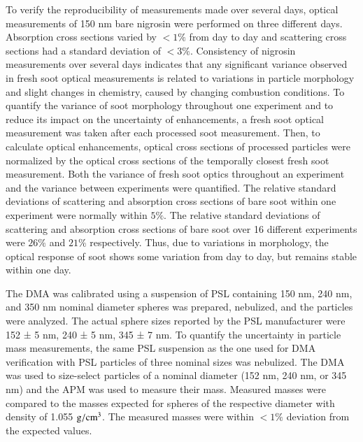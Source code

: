 To verify the reproducibility of measurements made over several days, optical measurements of 150 nm bare nigrosin were performed on three different days. Absorption cross sections varied by $<1\%$ from day to day and scattering cross sections had a standard deviation of $<3\%$. Consistency of nigrosin measurements over several days indicates that any significant variance observed in fresh soot optical measurements is related to variations in particle morphology and slight changes in chemistry, caused by changing combustion conditions. To quantify the variance of soot morphology throughout one experiment and to reduce its impact on the uncertainty of enhancements, a fresh soot optical measurement was taken after each processed soot measurement. Then, to calculate optical enhancements, optical cross sections of processed particles were normalized by the optical cross sections of the temporally closest fresh soot measurement. Both the variance of fresh soot optics throughout an experiment and the variance between experiments were quantified. The relative standard deviations of scattering and absorption cross sections of bare soot within one experiment were normally within $5\%$. The relative standard deviations of scattering and absorption cross sections of bare soot over 16 different experiments were $26\%$ and $21\%$ respectively. Thus, due to variations in morphology, the optical response of soot shows some variation from day to day, but remains stable within one day.

The DMA was calibrated using a suspension of PSL containing 150 nm, 240 nm, and 350 nm nominal diameter spheres was prepared, nebulized, and the particles were analyzed. The actual sphere sizes reported by the PSL manufacturer were 152 ± 5 nm, 240 ± 5 nm, 345 ± 7 nm.
To quantify the uncertainty in particle mass measurements, the same PSL suspension as the one used for DMA verification with PSL particles of three nominal sizes was nebulized. The DMA was used to size-select particles of a nominal diameter (152 nm, 240 nm, or 345 nm) and the APM was used to measure their mass. Measured masses were compared to the masses expected for spheres of the respective diameter with density of 1.055 $\rm g/cm^3$. The measured masses were within $<1\%$ deviation from the expected values.

